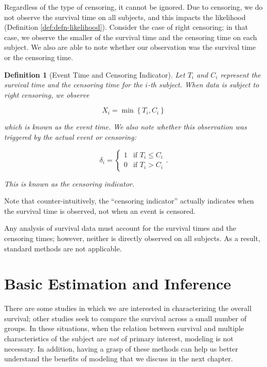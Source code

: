 \documentclass[
]{book}
\theoremstyle{plain}
\theoremstyle{mydefn}
\newtheorem{definition}{Definition}[chapter]
\theoremstyle{myexmpl}
\theoremstyle{remark}
\begin{document}
Regardless of the type of censoring, it cannot be ignored. Due to censoring, we do not observe the survival time on all subjects, and this impacts the likelihood (Definition \ref{def:defn-likelihood}). Consider the case of right censoring; in that case, we observe the smaller of the survival time and the censoring time on each subject. We also are able to note whether our observation was the survival time or the censoring time.

\begin{definition}[Event Time and Censoring Indicator]
\protect\hypertarget{def:defn-event-time}{}{\label{def:defn-event-time} {} }Let \(T_i\) and \(C_i\) represent the survival time and the censoring time for the \(i\)-th subject. When data is subject to right censoring, we observe

\[X_i = \min\left\{T_i, C_i\right\}\]

which is known as the \emph{event} time. We also note whether this observation was triggered by the actual event or censoring:

\[\delta_i = \begin{cases} 1 & \text{if } T_i \leq C_i \\ 0 & \text{if } T_i > C_i \end{cases}.\]

This is known as the \emph{censoring indicator}.
\end{definition}

\begin{rmdwarning}
Note that counter-intuitively, the ``censoring indicator'' actually indicates when the survival time is observed, not when an event is censored.
\end{rmdwarning}

Any analysis of survival data must account for the survival times and the censoring times; however, neither is directly observed on all subjects. As a result, standard methods are not applicable.

\hypertarget{surv-basic}{%
\chapter{Basic Estimation and Inference}\label{surv-basic}}

There are some studies in which we are interested in characterizing the overall survival; other studies seek to compare the survival across a small number of groups. In these situations, when the relation between survival and multiple characteristics of the subject are \emph{not} of primary interest, modeling is not necessary. In addition, having a grasp of these methods can help us better understand the benefits of modeling that we discuss in the next chapter.
\end{document}
